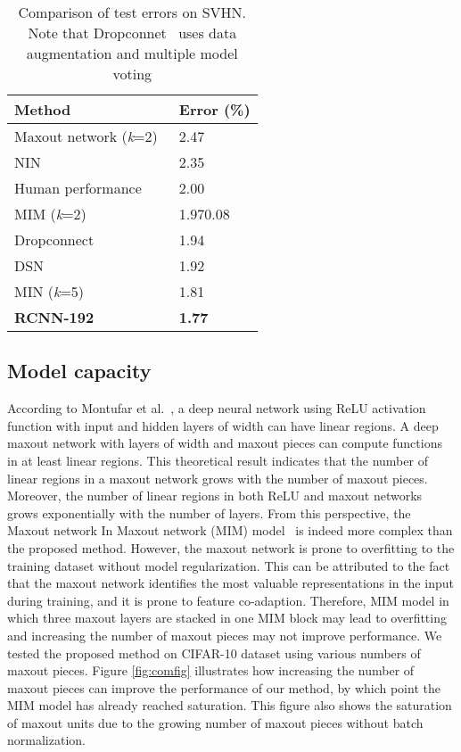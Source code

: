 \documentclass[10pt,twocolumn,letterpaper]{article}
\begin{document}
\begin{table}
\begin{center}
\caption{Comparison of test errors on SVHN. Note that Dropconnet~\cite{wan2013regularization} uses data augmentation and multiple model voting}
\begin{tabular}{|p{1.6in}|p{0.6in}|} \hline 
Method & Error (\%) \\ \hline 
Maxout network (\textit{k}=2)~\cite{goodfellow2013maxout} & 2.47 \\ \hline 
NIN~\cite{DBLP:journals/corr/LinCY13} & 2.35 \\ \hline 
Human performance~\cite{sermanet2012convolutional} & 2.00 \\ \hline 
MIM (\textit{k}=2)~\cite{liao2015importance} & 1.970.08 \\ \hline 
Dropconnect~\cite{wan2013regularization} & 1.94 \\ \hline 
DSN~\cite{lee2014deeply} & 1.92 \\ \hline 
MIN (\textit{k}=5)\textbf{} & 1.81 \\ \hline 
\textbf{RCNN-192}~\cite{Liang_2015_CVPR} & \textbf{1.77} \\ \hline
\end{tabular}
\label{tab:svhn}
\end{center}
\end{table}

\subsection{Model capacity}



 According to Montufar et al.~\cite{montufar2014number}, a deep neural network using ReLU activation function with  input and  hidden layers of width   can have  linear regions. A deep maxout network with  layers of width  and  maxout pieces can compute functions in at least  linear regions. This theoretical result indicates that the number of linear regions in a maxout network grows with the number of maxout pieces. Moreover, the number of linear regions in both ReLU and maxout networks grows exponentially with the number of layers. From this perspective, the Maxout network In Maxout network (MIM) model~\cite{liao2015importance} is indeed more complex than the proposed method.
However, the maxout network is prone to overfitting to the training dataset without model regularization. This can be attributed to the fact that the maxout network identifies the most valuable representations in the input during training, and it is prone to feature co-adaption. Therefore, MIM model in which three maxout layers are stacked in one MIM block may lead to overfitting and increasing the number of maxout pieces may not improve performance. We tested the proposed method on CIFAR-10 dataset using various numbers of maxout pieces. Figure \ref{fig:comfig} illustrates how increasing the number of maxout pieces can improve the performance of our method, by which point the MIM model has already reached saturation. This figure also shows the saturation of maxout units due to the growing number of maxout pieces without batch normalization. 
\end{document}
